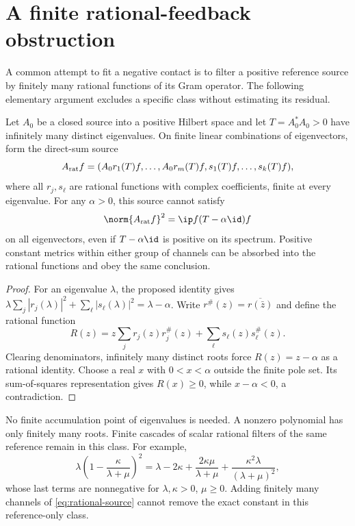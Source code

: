 \section{A finite rational-feedback obstruction}\label{app:rational}
A common attempt to fit a negative contact is to filter a positive
reference source by finitely many rational functions of its Gram
operator. The following elementary argument excludes a specific class
without estimating its residual.

\begin{proposition}\label{prop:rational}
Let $A_0$ be a closed source into a positive Hilbert space and let
$T=A_0^*A_0>0$ have infinitely many distinct eigenvalues. On finite
linear combinations of eigenvectors, form the direct-sum source
\begin{equation}\label{eq:rational-source}
 A_{\rm rat}f=(A_0r_1(T)f,\ldots,A_0r_m(T)f,
                 s_1(T)f,\ldots,s_k(T)f),
\end{equation}
where all $r_j,s_\ell$ are rational functions with complex coefficients,
finite at every eigenvalue. For any $\alpha>0$, this source cannot
satisfy
\begin{equation}\label{eq:rational-target}
 \norm{A_{\rm rat}f}^2=\ip f{(T-\alpha\id)f}
\end{equation}
on all eigenvectors, even if $T-\alpha\id$ is positive on its spectrum.
Positive constant metrics within either group of channels can be
absorbed into the rational functions and obey the same conclusion.
\end{proposition}
\begin{proof}
For an eigenvalue $\lambda$, the proposed identity gives
$\lambda\sum_j|r_j(\lambda)|^2+\sum_\ell|s_\ell(\lambda)|^2
=\lambda-\alpha$. Write
$r^\#(z)=\overline{r(\bar z)}$ and define the rational function
\begin{equation}\label{eq:rational-identity}
 R(z)=z\sum_jr_j(z)r_j^\#(z)
              +\sum_\ell s_\ell(z)s_\ell^\#(z).
\end{equation}
Clearing denominators, infinitely many distinct roots force
$R(z)=z-\alpha$ as a rational identity. Choose a real $x$ with
$0<x<\alpha$ outside the finite pole set. Its sum-of-squares
representation gives $R(x)\geq0$, while $x-\alpha<0$, a contradiction.
\end{proof}
No finite accumulation point of eigenvalues is needed. A nonzero
polynomial has only finitely many roots. Finite cascades of scalar
rational filters of the same reference remain in this class.
For example,
\begin{equation}\label{eq:rational-example}
 \lambda\left(1-\frac\kappa{\lambda+\mu}\right)^2
 =\lambda-2\kappa+\frac{2\kappa\mu}{\lambda+\mu}
             +\frac{\kappa^2\lambda}{(\lambda+\mu)^2},
\end{equation}
whose last terms are nonnegative for $\lambda,\kappa>0$, $\mu\geq0$.
Adding finitely many channels of \eqref{eq:rational-source} cannot
remove the exact constant in this reference-only class.

